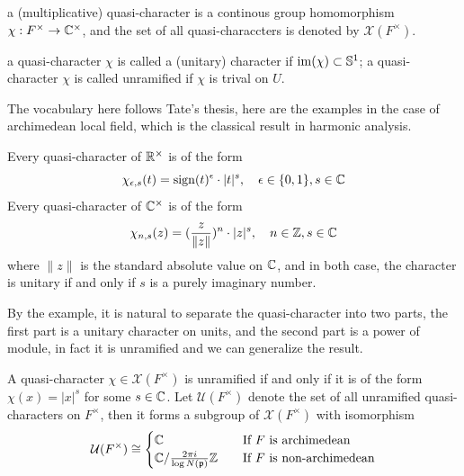 \begin{definition}
    a (multiplicative) quasi-character is a continous group homomorphism \(\chi: F^\times \to \mathbb{C}^\times\), and the set of all quasi-characcters is denoted by \(\mathcal{X}(F^\times)\).

    a quasi-character \(\chi\) is called a (unitary) character if \(\mathrm{im}(\chi) \subset \mathbb{S}^1\); a quasi-character \(\chi\) is called unramified if \(\chi\) is trival on \(U\).
\end{definition}

The vocabulary here follows Tate's thesis, here are the examples in the case of archimedean local field, which is the classical result in harmonic analysis.

\begin{example} \label{archimedeanquasicharacter}
    Every quasi-character of \(\mathbb{R}^\times\) is of the form
    \[\chi_{\epsilon,s}(t) = \mathrm{sign}(t)^{\epsilon} \cdot |t|^s, \quad \epsilon \in \{0,1\}, s \in \mathbb{C}\]
    Every quasi-character of \(\mathbb{C}^\times\) is of the form
    \[\chi_{n,s}(z) = (\frac{z}{\|z\|})^n \cdot |z|^s, \quad n \in \mathbb{Z}, s \in \mathbb{C}\]
    where \(\|z\|\) is the standard absolute value on \(\mathbb{C}\), and in both case, the character is unitary if and only if \(s\) is a purely imaginary number.
\end{example}

By the example, it is natural to separate the quasi-character into two parts, the first part is a unitary character on units, and the second part is a power of module, in fact it is unramified and we can generalize the result.

\begin{lemma} \label{unramifiedquasicharacter}
    A quasi-character \(\chi \in \mathcal{X}(F^\times)\) is unramified if and only if it is of the form \(\chi(x) = |x|^s\) for some \(s \in \mathbb{C}\). Let \(\mathcal{U}(F^\times)\) denote the set of all unramified quasi-characters on \(F^\times\), then it forms a subgroup of \(\mathcal{X}(F^\times)\) with isomorphism
    \[\mathcal{U}(F^\times) \cong \begin{cases}
        \mathbb{C} \quad &\text{If } F \text{ is archimedean} \\
        \mathbb{C}/\frac{2\pi i}{\log N(\mathfrak{p})}\mathbb{Z} \quad &\text{If } F \text{ is non-archimedean}
    \end{cases}\]


\end{lemma}

